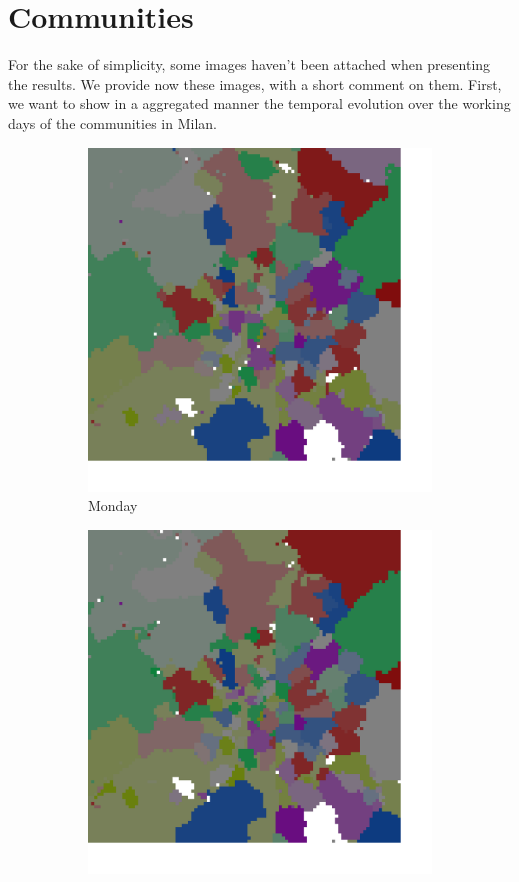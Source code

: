 \documentclass[12pt,a4paper]{article}
\begin{document}
\appendix
\section{Communities}
For the sake of simplicity, some images haven't been attached when presenting the results. We provide now these images, with a short comment on them.
First, we want to show in a aggregated manner the temporal evolution over the working days of the communities in Milan.

\begin{figure}[H]
\centering
\begin{subfigure}[b]{0.30\textwidth}
\includegraphics[width=\textwidth]{week/1Mon.png}
\caption{Monday}
\end{subfigure}
\begin{subfigure}[b]{0.30\textwidth}
\includegraphics[width=\textwidth]{week/2Tue.png}

\end{subfigure}
\end{figure}
\end{document}
